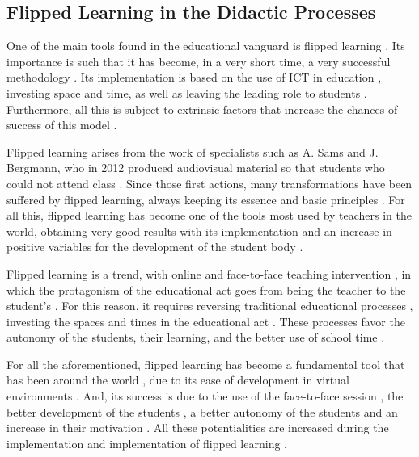 \documentclass[english]{textolivre}
\begin{document}
\subsection{Flipped Learning in the Didactic Processes}
One of the main tools found in the educational vanguard is flipped learning \cite{sanchez2019}. Its importance is such that it has become, in a very short time, a very successful methodology \cite{seery2015, zainuddin2019}. Its implementation is based on the use of ICT in education \cite{lopezbelmonte+pozosanchez+fuentescabrera+lopeznunez2019}, %
investing space and time, as well as leaving the leading role to students \cite{froehlich2018, mclaughlin2014}. Furthermore, all this is subject to extrinsic factors that increase the chances of success of this model \cite{mengualandres+lopezbelmonte+fuentescabrera+pozosanchez+2020}. %

Flipped learning arises from the work of specialists such as A. Sams and J. Bergmann, who in 2012 produced audiovisual material so that students who could not attend class \cite{bergmann2012}. Since those first actions, many transformations have been suffered by flipped learning, always keeping its essence and basic principles \cite{sola2019}. For all this, flipped learning has become one of the tools most used by teachers in the world, obtaining very good results with its implementation \cite{awidi2019, yoshida2015} and an increase in positive variables for the development of the student body \cite{fuentescabrera2020}. %

Flipped learning is a trend, with online and face-to-face teaching intervention \cite{lee2017, nortvig2018}, in which the protagonism of the educational act goes from being the teacher to the student's \cite{jensen2018, kwan2017}. %
For this reason, it requires reversing traditional educational processes \cite{bauer2016}, investing the spaces and times in the educational act \cite{lopezbelmonte+morenoguerrero+lopeznunes+pozosanchez2019}. %
These processes favor the autonomy of the students, their learning, and the better use of school time \cite{abeysekera2014, borao2016, longcummins2017, schmidt2016}.

For all the aforementioned, flipped learning has become a fundamental tool that has been around the world \cite{pozosanchez-lopezbelmonte-morenoguerrero-solareche-fuentes2020}, %
due to its ease of development in virtual environments \cite{nouri2016, zainuddin2016}. And, its success is due to the use of the face-to-face session \cite{baez2019, castellanos2017, hwang2015}, the better development of the students \cite{bognar2019, longlogan2016}, a better autonomy of the students \cite{salas2019, touron2015} and an increase in their motivation \cite{shih2017, tse2019}. All these potentialities are increased during the implementation and implementation of flipped learning \cite{fisher2017, karabulut2018}.
\end{document}
